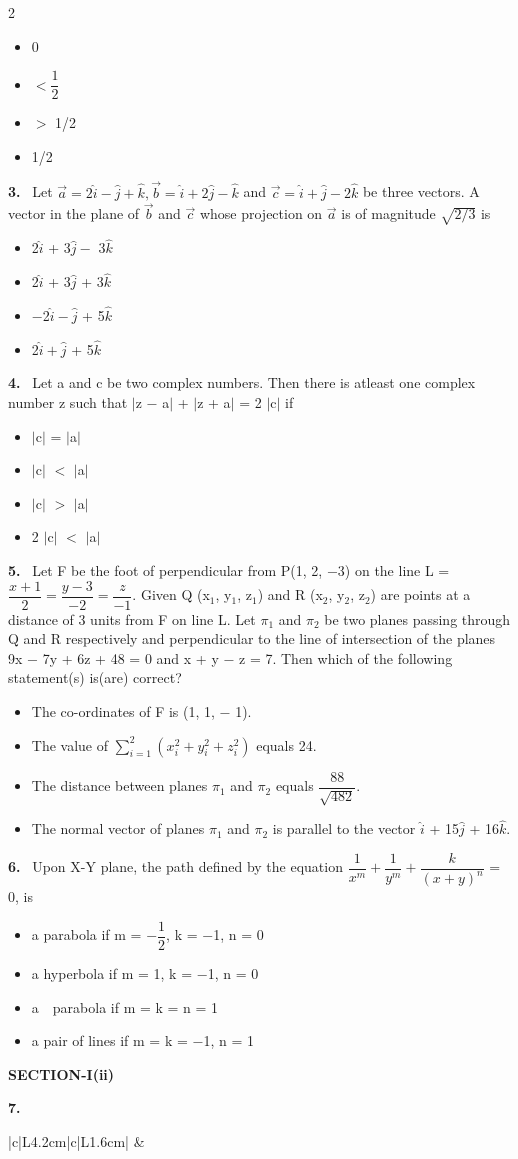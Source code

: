 \documentclass[10pt]{extarticle}
\newcommand{\sect}[1]{\par\smallskip\noindent\textbf{#1}\par}
\newcommand{\qn}[1]{\par\smallskip\noindent\textbf{#1.}~}
\newenvironment{qoptions}{\begin{itemize}[leftmargin=1.8em,itemsep=1pt,topsep=2pt,label={}]}{\end{itemize}}
\newcommand{\opt}[2]{\item[(#1)] #2}
\begin{document}
\begin{multicols}{2}
\begin{qoptions}
\opt{A}{0}
\opt{B}{$<\dfrac12$}
\opt{C}{$>$ 1/2}
\opt{D}{1/2}
\end{qoptions}
\qn{3} Let $\vec a=2\hat i-\hat j+\hat k,\vec b=\hat i+2\hat j-\hat k$ and $\vec c=\hat i+\hat j-2\hat k$ be three vectors. A vector in the plane of $\vec b$ and $\vec c$ whose projection on $\vec a$ is of magnitude $\sqrt{2/3}$ is
\begin{qoptions}
\opt{A}{2$\hat i$ + 3$\hat j-$ 3$\hat k$}
\opt{B}{2$\hat i$ + 3$\hat j$ + 3$\hat k$}
\opt{C}{$-$2$\hat i-\hat j$ + 5$\hat k$}
\opt{D}{2$\hat i+\hat j$ + 5$\hat k$}
\end{qoptions}
\qn{4} Let a and c be two complex numbers. Then there is atleast one complex number z such that $|$z $-$ a$|$ + $|$z + a$|$ = 2 $|$c$|$ if
\begin{qoptions}
\opt{A}{$|$c$|$ = $|$a$|$}
\opt{B}{$|$c$|$ $<$ $|$a$|$}
\opt{C}{$|$c$|$ $>$ $|$a$|$}
\opt{D}{2 $|$c$|$ $<$ $|$a$|$}
\end{qoptions}
\qn{5} Let F be the foot of perpendicular from P(1, 2, $-$3) on the line L = $\dfrac{x+1}2=\dfrac{y-3}{-2}=\dfrac z{-1}$. Given Q (x$_1$, y$_1$, z$_1$) and R (x$_2$, y$_2$, z$_2$) are points at a distance of 3 units from F on line L. Let $\pi_1$ and $\pi_2$ be two planes passing through Q and R respectively and perpendicular to the line of intersection of the planes 9x $-$ 7y + 6z + 48 = 0 and x + y $-$ z = 7. Then which of the following statement(s) is(are) correct?
\begin{qoptions}
\opt{A}{The co-ordinates of F is (1, 1, $-$ 1).}
\opt{B}{The value of $\displaystyle\sum_{i=1}^{2}\left(x_i^2+y_i^2+z_i^2\right)$ equals 24.}
\opt{C}{The distance between planes $\pi_1$ and $\pi_2$ equals $\dfrac{88}{\sqrt{482}}$.}
\opt{D}{The normal vector of planes $\pi_1$ and $\pi_2$ is parallel to the vector $\hat i$ + 15$\hat j$ + 16$\hat k$.}
\end{qoptions}
\qn{6} Upon X-Y plane, the path defined by the equation $\dfrac1{x^m}+\dfrac1{y^m}+\dfrac k{(x+y)^n}$ = 0, is
\begin{qoptions}
\opt{A}{a parabola if m = $-\dfrac12$, k = $-$1, n = 0}
\opt{B}{a hyperbola if m = 1, k = $-$1, n = 0}
\opt{C}{a\ \ parabola if m = k = n = 1}
\opt{D}{a pair of lines if m = k = $-$1, n = 1}
\end{qoptions}
\sect{SECTION-I(ii)}
\qn{7} {\footnotesize\setlength{\tabcolsep}{1.5pt}\noindent\begin{tabular}{|c|L{4.2cm}|c|L{1.6cm}|}
\hline
{} &  \\ \hline

\end{tabular}}
\end{multicols}
\end{document}
